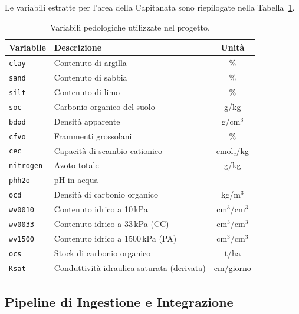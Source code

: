 \documentclass[a4paper,12pt]{article}
\begin{document}
Le variabili estratte per l'area della Capitanata sono riepilogate nella
Tabella~\ref{tab:variabili}.

\begin{table}[H]
    \centering
    \caption{Variabili pedologiche utilizzate nel progetto.}
    \label{tab:variabili}
    \begin{tabular}{@{}llc@{}}
        \toprule
        \textbf{Variabile} & \textbf{Descrizione} & \textbf{Unità} \\
        \midrule
        \texttt{clay}      & Contenuto di argilla            & \% \\
        \texttt{sand}      & Contenuto di sabbia             & \% \\
        \texttt{silt}      & Contenuto di limo               & \% \\
        \texttt{soc}       & Carbonio organico del suolo     & g/kg \\
        \texttt{bdod}      & Densità apparente               & g/cm$^3$ \\
        \texttt{cfvo}      & Frammenti grossolani            & \% \\
        \texttt{cec}       & Capacità di scambio cationico   & cmol$_c$/kg \\
        \texttt{nitrogen}  & Azoto totale                    & g/kg \\
        \texttt{phh2o}     & pH in acqua                     & -- \\
        \texttt{ocd}       & Densità di carbonio organico    & kg/m$^3$ \\
        \texttt{wv0010}    & Contenuto idrico a 10\,kPa      & cm$^3$/cm$^3$ \\
        \texttt{wv0033}    & Contenuto idrico a 33\,kPa (CC) & cm$^3$/cm$^3$ \\
        \texttt{wv1500}    & Contenuto idrico a 1500\,kPa (PA) & cm$^3$/cm$^3$ \\
        \texttt{ocs}       & Stock di carbonio organico      & t/ha \\
        \texttt{Ksat}      & Conduttività idraulica saturata (derivata) & cm/giorno \\
        \bottomrule
    \end{tabular}
\end{table}

\subsection{Pipeline di Ingestione e Integrazione}
\end{document}
